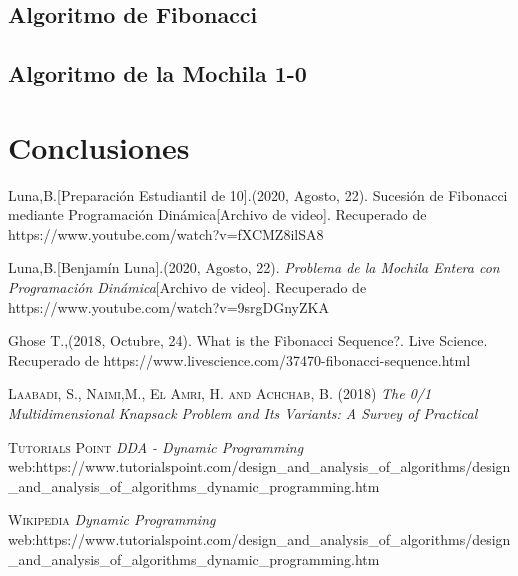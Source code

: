 \documentclass{report}
\begin{document}
    \section*{Algoritmo de Fibonacci}
        
        \newpage
    \section*{Algoritmo de la Mochila 1-0}
        
        
\chapter*{Conclusiones}
    
    
\begin{thebibliography}{}

    Luna,B.[Preparación Estudiantil de 10].(2020, Agosto, 22). Sucesión de Fibonacci mediante Programación Dinámica[Archivo de video]. Recuperado de https://www.youtube.com/watch?v=fXCMZ8ilSA8
    
    Luna,B.[Benjamín Luna].(2020, Agosto, 22). \textit{Problema de la Mochila Entera con Programación Dinámica}[Archivo de video]. Recuperado de https://www.youtube.com/watch?v=9srgDGnyZKA
    
    Ghose T.,(2018, Octubre, 24). What is the Fibonacci Sequence?. Live Science. Recuperado de https://www.livescience.com/37470-fibonacci-sequence.html
    
     \textsc{Laabadi, S., Naimi,M., El Amri, H. and Achchab, B.} (2018) \textit{The 0/1 Multidimensional Knapsack Problem and Its Variants: A Survey of Practical}
    
    \textsc{Tutorials Point} \textit{DDA - Dynamic Programming} web:https://www.tutorialspoint.com/design\_and\_analysis\_of\_algorithms/design\_and\_analysis\_of\_algorithms\_dynamic\_programming.htm
    
    \textsc{Wikipedia} \textit{Dynamic Programming} web:https://www.tutorialspoint.com/design\_and\_analysis\_of\_algorithms/design\_and\_analysis\_of\_algorithms\_dynamic\_programming.htm
\end{thebibliography}
\end{document}
